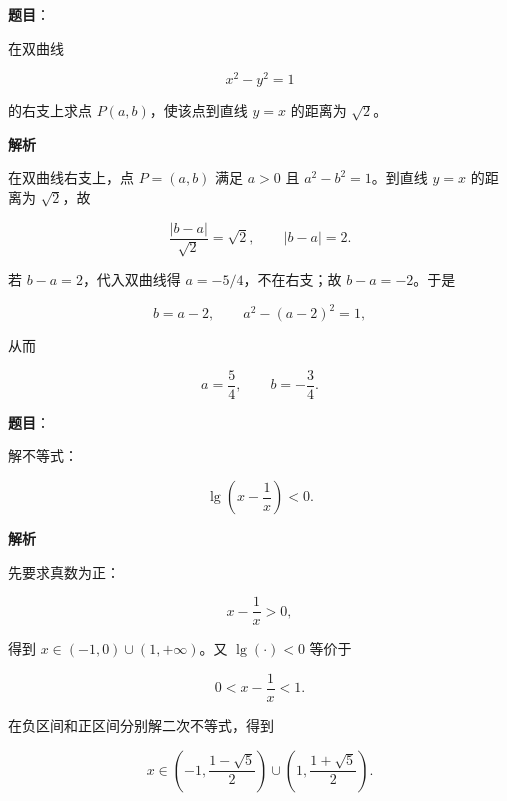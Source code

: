 \begin{answer}

\textbf{题目}：

在双曲线

\nopagebreak[4]
\[
x^2-y^2=1
\]

的右支上求点 $P(a,b)$，使该点到直线 $y=x$ 的距离为 $\sqrt2$。

\textbf{解析}

在双曲线右支上，点 $P=(a,b)$ 满足 $a>0$ 且 $a^2-b^2=1$。到直线 $y=x$ 的距离为 $\sqrt2$，故

\nopagebreak[4]
\[
\frac{|b-a|}{\sqrt2}=\sqrt2,
\qquad |b-a|=2.
\]

若 $b-a=2$，代入双曲线得 $a=-5/4$，不在右支；故 $b-a=-2$。于是

\nopagebreak[4]
\[
b=a-2,\qquad a^2-(a-2)^2=1,
\]

从而

\nopagebreak[4]
\[
a=\frac54,\qquad b=-\frac34.
\]


\end{answer}
\begin{answer}

\textbf{题目}：

解不等式：

\nopagebreak[4]
\[
\lg\left(x-\frac1x\right)<0.
\]

\textbf{解析}

先要求真数为正：

\nopagebreak[4]
\[
x-\frac1x>0,
\]

得到 $x\in(-1,0)\cup(1,+\infty)$。又 $\lg(\cdot)<0$ 等价于

\nopagebreak[4]
\[
0<x-\frac1x<1.
\]

在负区间和正区间分别解二次不等式，得到

\nopagebreak[4]
\[
x\in\left(-1,\frac{1-\sqrt5}{2}\right)
\cup
\left(1,\frac{1+\sqrt5}{2}\right).
\]


\end{answer}
